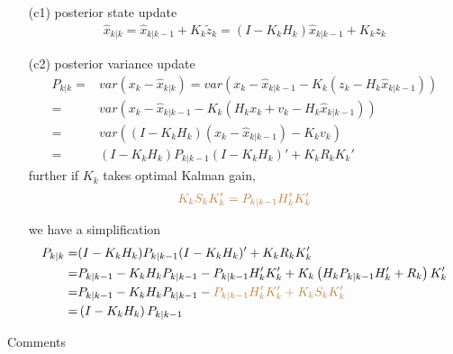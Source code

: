 \begin{itemize}[topsep=2pt,itemsep=0pt]
    
    \item[(c1)] posterior state update
    \begin{align}\label{EqaKalmanPosteriorUpdate}
        \hat{x}_{k|k}=\hat{x}_{k|k-1}+K_k\tilde{z}_k=\left(I-K_kH_k\right)\hat{x}_{k|k-1}+K_kz_k
    \end{align}
    \item[(c2)] posterior variance update
    \begin{align}\label{EqaKalmanFilterPostVarUpdate}
        P_{k|k}=&var(x_k-\hat{x}_{k|k})=var\left( x_k-\hat{x}_{k|k-1}-K_k(z_k-H_k\hat{x}_{k|k-1}) \right)\\
        =&var\left( x_k-\hat{x}_{k|k-1}-K_k(H_kx_k+v_k-H_k\hat{x}_{k|k-1}) \right)\\
        =&var\left((I-K_kH_k)(x_k-\hat{x}_{k|k-1})-K_kv_k\right)\\
        =&(I-K_kH_k)P_{k|k-1}(I-K_kH_k)'+K_kR_kK_k'
    \end{align}
    further if $ K_k $ takes optimal Kalman gain, 
    \begin{align}
        \color{brown}K_kS_kK_k'= P_{k|k-1}H_k'K_k'
    \end{align}
    
    we have a simplification
    \begin{align}
        P_{k|k}=& (I-K_kH_k)P_{k|k-1}(I-K_kH_k)'+K_kR_kK_k' \\
        =& P_{k|k-1}-K_kH_kP_{k|k-1}-P_{k|k-1}H_k'K_k' + K_k\left( H_kP_{k|k-1}H_k'+R_k\right)K_k'\\
        =&P_{k|k-1}-K_kH_kP_{k|k-1}-{\color{brown}P_{k|k-1}H_k'K_k'+K_kS_kK_k'}\\
        =&\left(I-K_kH_k\right)P_{k|k-1}
    \end{align}
    
\end{itemize}

\begin{point}
    Comments
\end{point}

